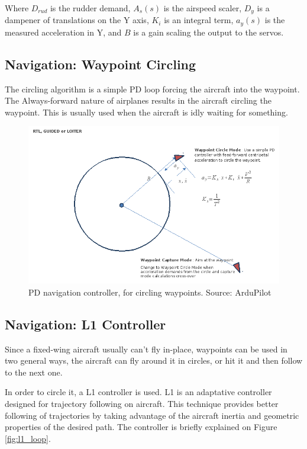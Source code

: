 Where $D_{rud}$ is the rudder demand, $A_s(s)$ is the airspeed scaler, $D_y$ is a dampener of translations on the Y axis, $K_i$ is an integral term, $a_y(s)$ is the measured acceleration in Y, and $B$ is a gain scaling the output to the servos.
\subsection{Navigation: Waypoint Circling}

The circling algorithm is a simple PD loop forcing the aircraft into the waypoint. The Always-forward nature of airplanes results in the aircraft circling the waypoint. This is usually used when the aircraft is idly waiting for something.

\begin{figure}[H]
\centering
  \includegraphics[width=0.8\linewidth]{figs/pd_loiter.png}	
  \caption{PD navigation controller, for circling waypoints. Source: ArduPilot}
  \label{fig:pd_loop}
\end{figure}


\subsection{Navigation: L1 Controller}

%
%
Since a fixed-wing aircraft usually can't fly in-place, waypoints can be used in two general ways, the aircraft can fly around it in circles, or hit it and then follow to the next one.

In order to circle it, a L1 controller is used. L1 is an adaptative controller designed for trajectory following on aircraft\cite{Park04_GNC}. This technique provides better following of trajectories by taking advantage of the aircraft inertia and geometric properties of the desired path. The controller is briefly explained on Figure \ref{fig:l1_loop}.
%
%


